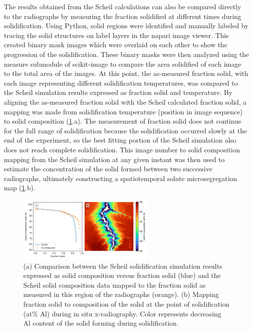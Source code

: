 The results obtained from the Scheil calculations can also be compared
directly to the radiographs by measuring the fraction solidified at
different times during solidification. Using Python, solid regions were
identified and manually labeled by tracing the solid structures on label
layers in the napari image viewer. This created binary mask images which
were overlaid on each other to show the progression of the solidification.
These binary masks were then analyzed using the measure submodule of
scikit-image to compare the area solidified of each image to the total
area of the images. At this point, the as-measured fraction solid, with
each image representing different solidification temperatures, was
compared to the Scheil simulation results expressed as fraction solid and
temperature. By aligning the as-measured fraction solid with the Scheil
calculated fraction solid, a mapping was made from solidification
temperature (position in image sequence) to solid composition
(\ref{fig/03/solid-frac}.a).
The measurement of fraction solid does not continue for the full range of
solidification because the solidification occurred slowly at the end of
the experiment, so the best fitting portion of the Scheil simulation also
does not reach complete solidification. This image number to solid
composition mapping from the Scheil simulation at any given instant was
then used to estimate the concentration of the solid formed between two
successive radiographs, ultimately constructing a spatiotemporal solute
microsegregation map (\ref{fig/03/solid-frac}.b).

\begin{figure}[ht]
    \centering
    \includegraphics[width=0.6\textwidth]{figures/03/04-solid-frac.png}
    \caption{
        \small{}
        (a) Comparison between the Scheil solidification simulation results
        expressed as solid composition versus fraction solid (blue) and the
        Scheil solid composition data mapped to the fraction solid as measured
        in this region of the radiographs (orange).
        (b) Mapping fraction solid to composition of the solid at the point
        of solidification (at\% Al) during in situ x-radiography. Color
        represents decreasing Al content of the solid forming during
        solidification.
    }
    \label{fig/03/solid-frac}
\end{figure}

